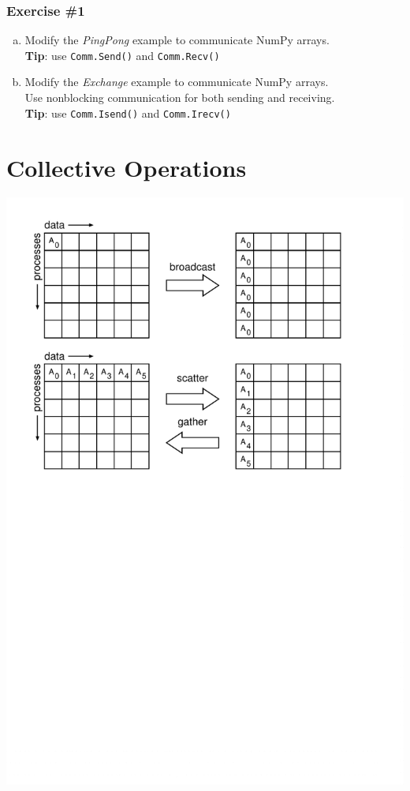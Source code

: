 \documentclass{beamer}
\begin{document}
\begin{frame}
  \frametitle{Exercise \#1}
  \begin{enumerate}[a)]
  \item Modify the \emph{PingPong} example to communicate NumPy arrays.\\
    \textbf{Tip}: use \texttt{Comm.Send()} and \texttt{Comm.Recv()}
  \item Modify the \emph{Exchange} example to communicate NumPy arrays.\\
    Use nonblocking communication for both sending and receiving.\\
    \textbf{Tip}: use \texttt{Comm.Isend()} and \texttt{Comm.Irecv()}
  \end{enumerate}
\end{frame}


\section{Collective Operations}

\begin{frame}
  \includegraphics[scale=0.75]{collectives1.pdf}
\end{frame}
\end{document}
